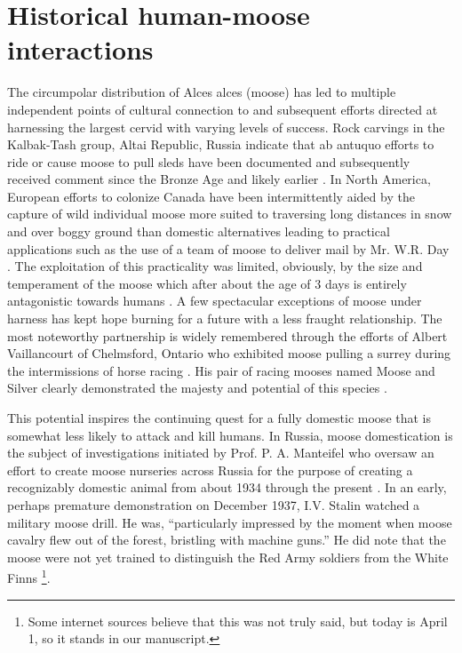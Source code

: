 \section{Historical human-moose interactions}
\label{app:history}

The circumpolar distribution of Alces alces (moose) has led to multiple independent points of cultural connection to and subsequent efforts directed at harnessing the largest cervid with varying levels of success. 
Rock carvings in the Kalbak-Tash group, Altai Republic, Russia indicate that ab antuquo efforts to ride or cause moose to pull sleds have been documented and subsequently received comment since the Bronze Age and likely earlier \citep{useev_2014}.
In North America, European efforts to colonize Canada have been intermittently aided by the capture of wild individual moose more suited to traversing long distances in snow and over boggy ground than domestic alternatives leading to practical applications such as the use of a team of moose to deliver mail by Mr. W.R. Day \citep{archives_unleashed}.
The exploitation of this practicality was limited, obviously, by the size and temperament of the moose which after about the age of 3 days is entirely antagonistic towards humans \citep{sipko_etal_2019}.
A few spectacular exceptions of moose under harness has kept hope burning for a future with a less fraught relationship. 
The most noteworthy partnership is widely remembered through the efforts of Albert Vaillancourt of Chelmsford, Ontario who exhibited moose pulling a surrey during the intermissions of horse racing \citep{chisholm_2019}.
His pair of racing mooses named Moose and Silver clearly demonstrated the majesty and potential of this species \citep{landry_1941}.
 
This potential inspires the continuing quest for a fully domestic moose that is somewhat less likely to attack and kill humans. 
In Russia, moose domestication is the subject of investigations initiated by Prof. P. A. Manteifel who oversaw an effort to create moose nurseries across Russia for the purpose of creating a recognizably domestic animal from about 1934 through the present \citep{sipko_etal_2019}.
In an early, perhaps premature demonstration on December 1937, I.V. Stalin watched a military moose drill. 
He was, “particularly impressed by the moment when moose cavalry flew out of the forest, bristling with machine guns.” He did note that the moose were not yet trained to distinguish the Red Army soldiers from the White Finns \citep{pererva_2017}\footnote{Some internet sources believe that this was not truly said, but today is April 1, so it stands in our manuscript.}.
